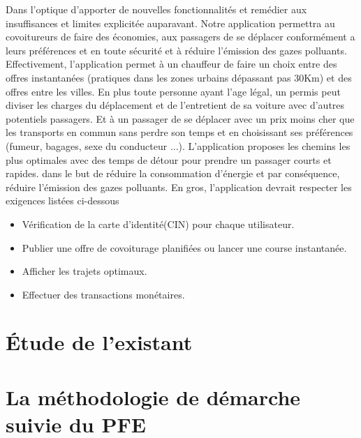 Dans l'optique d'apporter de nouvelles fonctionnalités et remédier aux insuffisances et limites explicitée auparavant. Notre application permettra au covoitureurs de faire des économies, aux passagers de se déplacer conformément a leurs préférences et en toute sécurité et à réduire l’émission des gazes polluants.\newline
Effectivement, l'application permet à un chauffeur de faire un choix entre des offres instantanées (pratiques dans les zones urbains dépassant pas 30Km) et des offres entre les villes. En plus toute personne ayant l'age légal, un permis peut diviser les charges du déplacement et de l'entretient de sa voiture avec d'autres potentiels passagers. Et à un passager de se déplacer avec un prix moins cher que les transports en commun sans perdre son temps et en choisissant ses préférences (fumeur, bagages, sexe du conducteur ...).\newline
L'application proposes les chemins les plus optimales avec des temps de détour pour prendre un passager courts et rapides. dans le but de réduire la consommation d’énergie et par conséquence, réduire l’émission des gazes polluants.
En gros, l'application devrait respecter les exigences listées ci-dessous
\begin{itemize}
	\item Vérification de la carte d'identité(CIN) pour chaque utilisateur.
	\item Publier une offre de covoiturage planifiées ou lancer une course instantanée.
	\item Afficher les trajets optimaux.
	\item Effectuer des transactions monétaires.
\end{itemize}

\section{Étude de l'existant}

\section{La méthodologie de démarche suivie du PFE}

